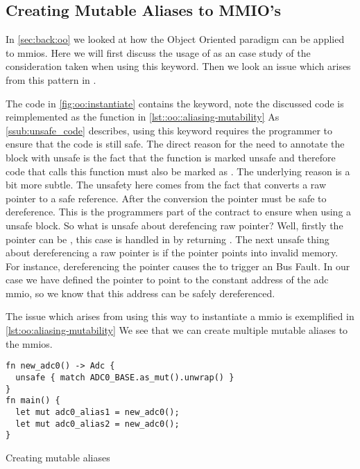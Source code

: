 \subsection{Creating Mutable Aliases to MMIO's}
\label{sec:res:aliasing-mmios}

In \autoref{sec:back:oo} we looked at how the Object Oriented paradigm can be applied to \glspl{mmio}.
Here we will first discuss the usage of {\unsafe} as an case study of the consideration taken when using this keyword.
Then we look an issue which arises from this pattern in {\rust}.

The {\rust} code in \autoref{fig:oo:instantiate} contains the {\unsafe} keyword, note the discussed code is reimplemented as the  function in \autoref{lst::oo::aliasing-mutability}
As \autoref{ssub:unsafe_code} describes, using this keyword requires the programmer to ensure that the code is still safe.
The direct reason for the need to annotate the block with unsafe is the fact that the function  is marked unsafe and therefore code that calls this function must also be marked as .
The underlying reason is a bit more subtle.
The unsafety here comes from the fact that  converts a raw pointer to a safe reference.
After the conversion the pointer must be safe to dereference.
This is the programmers part of the contract to ensure when using a unsafe block.
So what is unsafe about derefencing raw pointer?
Well, firstly the pointer can be , this case is handled in  by returning .
The next unsafe thing about dereferencing a raw pointer is if the pointer points into invalid memory.
For instance, dereferencing the pointer  causes the {\gecko} to trigger an Bus Fault.
In our case we have defined the pointer to point to the constant address of the \gls{adc} \gls{mmio}, so we know that this address can be safely dereferenced.

The issue which arises from using this way to instantiate a \gls{mmio} is exemplified in \autoref{lst:oo:aliasing-mutability}
We see that we can create multiple mutable aliases to the \glspl{mmio}.

\begin{listing}[H]
  \begin{verbatim}
fn new_adc0() -> Adc {
  unsafe { match ADC0_BASE.as_mut().unwrap() }
}
fn main() {
  let mut adc0_alias1 = new_adc0();
  let mut adc0_alias2 = new_adc0();
}
  \end{verbatim}
  \caption{Creating mutable aliases}
  \label{lst:oo:aliasing-mutability}
\end{listing}

